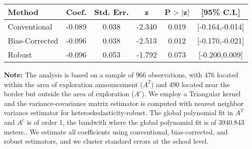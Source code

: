 \begin{table}[htbp]\centering
 \footnotesize 
\begin{tabular}{lccccc}
\hline\hline
Method & Coef. & Std. Err. & z & P$>|$z$|$ & [95\% C.I.] \\ 
\hline \hline  
Conventional & -0.089 & 0.038 & -2.340 & 0.019 & [-0.164,-0.014] \\ 
 Bias-Corrected & -0.096 & 0.038 & -2.513 & 0.012 & [-0.170,-0.021] \\ 
Robust & -0.096 & 0.053 & -1.792 & 0.073 & [-0.200,0.009] \\ 
  \hline\hline
\end{tabular}
\label{table:rd}
\begin{tablenotes} 
  \justifying \tiny \textbf{Note: }    
   The analysis is based on a sample of 966 observations, with 476 located within the area of exploration announcement ($A^{T}$) and 490 located near the border but outside the area of exploration  ($A^{c}$). 
           We employ a Triangular kernel and the variance-covariance matrix estimator is computed with nearest neighbor variance estimator for heteroskedasticity-robust. The global polynomial fit in  $A^{T}$ and $A^{c}$ is of order 1, the bandwith where the global polynomial fit is of 3940.843 meters.. We estimate all coefficients using conventional, bias-corrected, and robust estimators, and we cluster standard errors at the school level. \end{tablenotes} 
 \end{table} 
